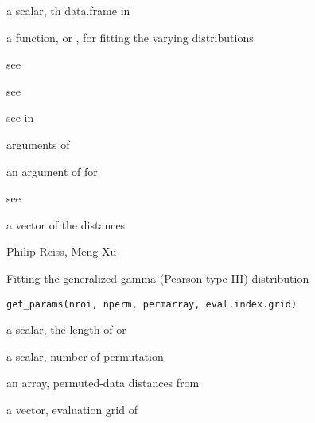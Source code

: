 \documentclass[a4paper]{book}
\begin{document}
\begin{Arguments}
\begin{ldescription}
\item[\code{k}] a scalar, th data.frame in 

\item[\code{vdFun}] a function,  or , for fitting the varying distributions

\item[\code{ydata1}] see 

\item[\code{ydata2}] see 

\item[\code{ind.grid}] see  in 

\item[\code{...}] arguments of 

\item[\code{excl}] an argument of  for 

\item[\code{dist.method}] see 
\end{ldescription}
\end{Arguments}
%
\begin{Value}
a vector of the distances
\end{Value}
%
\begin{Author}\relax
Philip Reiss, Meng Xu
\end{Author}
%
\begin{SeeAlso}\relax
{}
\end{SeeAlso}
%
\begin{Description}\relax
Fitting the generalized gamma (Pearson type III) distribution
\end{Description}
%
\begin{Usage}
\begin{verbatim}
get_params(nroi, nperm, permarray, eval.index.grid)
\end{verbatim}
\end{Usage}
%
\begin{Arguments}
\begin{ldescription}
\item[\code{nroi}] a scalar, the length of  or 

\item[\code{nperm}] a scalar, number of permutation

\item[\code{permarray}] an array, permuted-data distances from 

\item[\code{eval.index.grid}] a vector, evaluation grid of 
\end{ldescription}
\end{Arguments}
\end{document}
